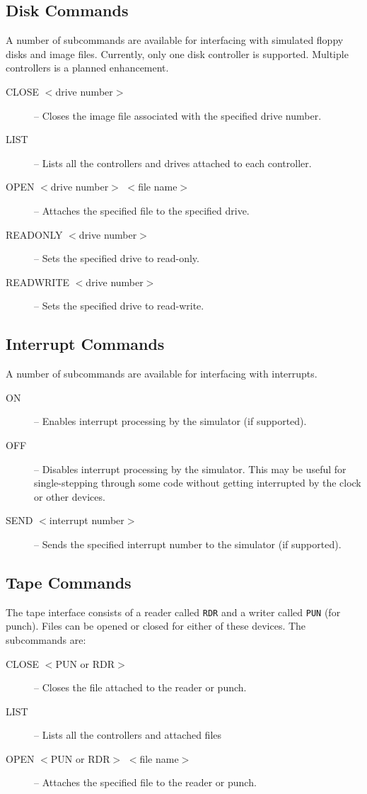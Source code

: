 \documentclass[10pt, openany]{book}
\begin{document}
\subsection{Disk Commands}
A number of subcommands are available for interfacing with simulated floppy disks and image files.  Currently, only one disk controller is supported.  Multiple controllers is a planned enhancement.
\begin{description}
  \item[CLOSE $<$drive number$>$] -- Closes the image file associated with the specified drive number.
  \item[LIST] -- Lists all the controllers and drives attached to each controller.
  \item[OPEN $<$drive number$>$ $<$file name$>$] -- Attaches the specified file to the specified drive.
  \item[READONLY $<$drive number$>$] -- Sets the specified drive to read-only.
  \item[READWRITE $<$drive number$>$] -- Sets the specified drive to read-write.
\end{description}

\subsection{Interrupt Commands}
A number of subcommands are available for interfacing with interrupts.
\begin{description}
  \item[ON] -- Enables interrupt processing by the simulator (if supported).
  \item[OFF] -- Disables interrupt processing by the simulator.  This may be useful for single-stepping through some code without getting interrupted by the clock or other devices.
  \item[SEND $<$interrupt number$>$] --  Sends the specified interrupt number to the simulator (if supported).
\end{description}

\subsection{Tape Commands}
The tape interface consists of a reader called \verb|RDR| and a writer called \verb|PUN| (for punch).  Files can be opened or closed for either of these devices.  The subcommands are:
\begin{description}
  \item[CLOSE $<$PUN or RDR$>$]  -- Closes the file attached to the reader or punch.
  \item[LIST] --  Lists all the controllers and attached files
  \item[OPEN $<$PUN or RDR$>$ $<$file name$>$] --  Attaches the specified file to the reader or punch.
\end{description}
\end{document}
